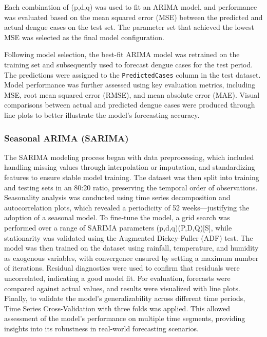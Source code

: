 Each combination of (p,d,q) was used to fit an ARIMA model, and performance was evaluated based on the mean squared error (MSE) between the predicted and actual dengue cases on the test set. The parameter set that achieved the lowest MSE was selected as the final model configuration.

Following model selection, the best-fit ARIMA model was retrained on the training set and subsequently used to forecast dengue cases for the test period. The predictions were assigned to the \texttt{PredictedCases} column in the test dataset. Model performance was further assessed using key evaluation metrics, including MSE, root mean squared error (RMSE), and mean absolute error (MAE). Visual comparisons between actual and predicted dengue cases were produced through line plots to better illustrate the model's forecasting accuracy.

\subsubsection{Seasonal ARIMA (SARIMA)}

The SARIMA modeling process began with data preprocessing, which included handling missing values through interpolation or imputation, and standardizing features to ensure stable model training. The dataset was then split into training and testing sets in an 80:20 ratio, preserving the temporal order of observations. Seasonality analysis was conducted using time series decomposition and autocorrelation plots, which revealed a periodicity of 52 weeks—justifying the adoption of a seasonal model. To fine-tune the model, a grid search was performed over a range of SARIMA parameters (p,d,q)(P,D,Q)[S], while stationarity was validated using the Augmented Dickey-Fuller (ADF) test. The model was then trained on the dataset using rainfall, temperature, and humidity as exogenous variables, with convergence ensured by setting a maximum number of iterations. Residual diagnostics were used to confirm that residuals were uncorrelated, indicating a good model fit. For evaluation, forecasts were compared against actual values, and results were visualized with line plots. Finally, to validate the model’s generalizability across different time periods, Time Series Cross-Validation with three folds was applied. This allowed assessment of the model’s performance on multiple time segments, providing insights into its robustness in real-world forecasting scenarios.

